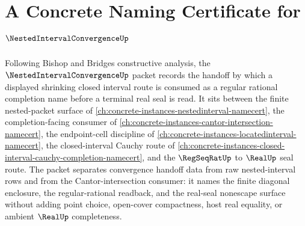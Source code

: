 \chapter{A Concrete Naming Certificate for $\NestedIntervalConvergenceUp$}
\label{ch:concrete-instances-nested-interval-convergence-namecert}

Following Bishop and Bridges constructive analysis, the $\NestedIntervalConvergenceUp$ packet records the handoff by which a displayed shrinking closed interval route is consumed as a regular rational completion name before a terminal real seal is read. It sits between the finite nested-packet surface of \autoref{ch:concrete-instances-nestedinterval-namecert}, the completion-facing consumer of \autoref{ch:concrete-instances-cantor-intersection-namecert}, the endpoint-cell discipline of \autoref{ch:concrete-instances-locatedinterval-namecert}, the closed-interval Cauchy route of \autoref{ch:concrete-instances-closed-interval-cauchy-completion-namecert}, and the $\RegSeqRatUp$ to $\RealUp$ seal route. The packet separates convergence handoff data from raw nested-interval rows and from the Cantor-intersection consumer: it names the finite diagonal enclosure, the regular-rational readback, and the real-seal nonescape surface without adding point choice, open-cover compactness, host real equality, or ambient $\RealUp$ completeness.

